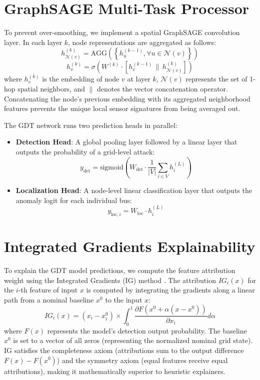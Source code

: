 \documentclass[12pt,a4paper]{report}
\begin{document}
\section{GraphSAGE Multi-Task Processor}
To prevent over-smoothing, we implement a spatial GraphSAGE convolution layer. In each layer $k$, node representations are aggregated as follows:
\begin{equation}
h_{\mathcal{N}(v)}^{(k)} = \text{AGG}\left( \left\{ h_u^{(k-1)}, \forall u \in \mathcal{N}(v) \right\} \right)
\end{equation}
\begin{equation}
h_v^{(k)} = \sigma \left( W^{(k)} \cdot \left[ h_v^{(k-1)} \,\|\, h_{\mathcal{N}(v)}^{(k)} \right] \right)
\end{equation}
where $h_v^{(k)}$ is the embedding of node $v$ at layer $k$, $\mathcal{N}(v)$ represents the set of 1-hop spatial neighbors, and $\|$ denotes the vector concatenation operator. Concatenating the node's previous embedding with its aggregated neighborhood features prevents the unique local sensor signatures from being averaged out.

The GDT network runs two prediction heads in parallel:
\begin{itemize}
    \item \textbf{Detection Head}: A global pooling layer followed by a linear layer that outputs the probability of a grid-level attack:
    \def\mean{\text{mean}}
    \begin{equation}
    y_{\text{det}} = \text{sigmoid}\left( W_{\text{det}} \cdot \frac{1}{|V|} \sum_{i \in V} h_i^{(L)} \right)
    \end{equation}
    \item \textbf{Localization Head}: A node-level linear classification layer that outputs the anomaly logit for each individual bus:
    \begin{equation}
    y_{\text{loc}, i} = W_{\text{loc}} \cdot h_i^{(L)}
    \end{equation}
\end{itemize}

\section{Integrated Gradients Explainability}
To explain the GDT model predictions, we compute the feature attribution weight using the Integrated Gradients (IG) method \cite{b7}. The attribution $IG_i(x)$ for the $i$-th feature of input $x$ is computed by integrating the gradients along a linear path from a nominal baseline $x^0$ to the input $x$:
\begin{equation}
IG_i(x) = (x_i - x_i^0) \times \int_{0}^{1} \frac{\partial F(x^0 + \alpha(x - x^0))}{\partial x_i} d\alpha
\end{equation}
where $F(x)$ represents the model's detection output probability. The baseline $x^0$ is set to a vector of all zeros (representing the normalized nominal grid state). IG satisfies the completeness axiom (attributions sum to the output difference $F(x) - F(x^0)$) and the symmetry axiom (equal features receive equal attributions), making it mathematically superior to heuristic explainers.
\end{document}
